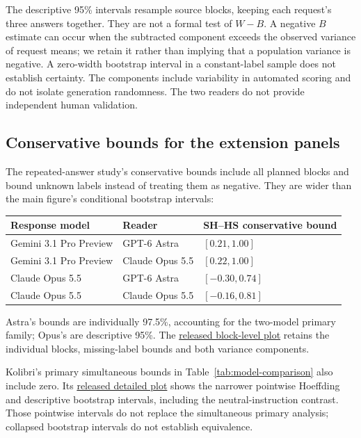 \documentclass[11pt]{article}
\begin{document}
The descriptive 95\% intervals resample source blocks, keeping each
request's three answers together. They are not a formal test of $W-B$.
A negative $B$ estimate can occur when the subtracted component exceeds
the observed variance of request means; we retain it rather than implying
that a population variance is negative. A zero-width bootstrap interval
in a constant-label sample does not establish certainty. The components
include variability in automated scoring and do not isolate generation
randomness. The two readers do not provide independent human validation.


\FloatBarrier
\subsection{Conservative bounds for the extension panels}
\label{app:kolibri-uncertainty}
\label{app:repeated-bounds}
The repeated-answer study's conservative bounds include all planned blocks
and bound unknown labels instead of treating them as negative. They are
wider than the main figure's conditional bootstrap intervals:
\begin{center}\small
\begin{tabular}{@{}lll@{}}
\toprule
Response model & Reader & SH--HS conservative bound\\
\midrule
Gemini 3.1 Pro Preview & GPT-6 Astra & $[0.21,1.00]$\\
Gemini 3.1 Pro Preview & Claude Opus 5.5 & $[0.22,1.00]$\\
Claude Opus 5.5 & GPT-6 Astra & $[-0.30,0.74]$\\
Claude Opus 5.5 & Claude Opus 5.5 & $[-0.16,0.81]$\\
\bottomrule
\end{tabular}
\end{center}
Astra's bounds are individually 97.5\%, accounting for the two-model
primary family; Opus's are descriptive 95\%.
The
\href{https://github.com/tdj28/llm_selfref_pre/blob/c09b19445c24e63f5160953883e71d76850fa9df/evidence/repeated_extension/repeated_main.pdf}{released block-level plot}
retains the individual blocks, missing-label bounds and both variance
components.

Kolibri's primary simultaneous bounds in Table~\ref{tab:model-comparison}
also include zero. Its
\href{https://github.com/tdj28/llm_selfref_pre/blob/3f9857bf47894b334e18ed370e257f458d0316c7/evidence/kolibri_extension/kolibri.pdf}{released detailed plot}
shows the narrower pointwise Hoeffding and descriptive bootstrap intervals,
including the neutral-instruction contrast. Those pointwise intervals do
not replace the simultaneous primary analysis; collapsed bootstrap
intervals do not establish equivalence.
\end{document}
